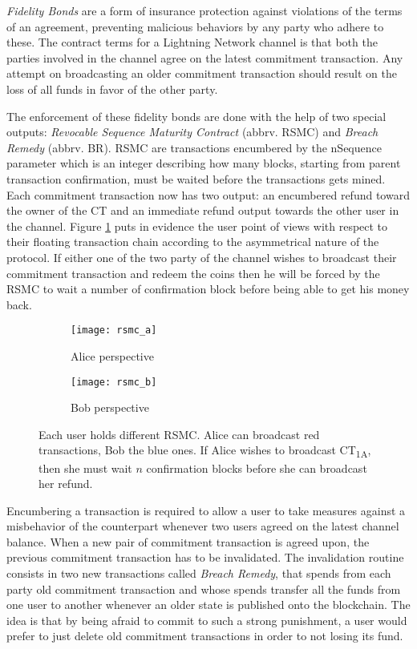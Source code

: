 		\textit{Fidelity Bonds} are a form of insurance protection against violations of the terms of an agreement, preventing malicious behaviors by any party who adhere to these. The contract terms for a Lightning Network channel is that both the parties involved in the channel agree on the latest commitment transaction. Any attempt on broadcasting an older commitment transaction should result on the loss of all funds in favor of the other party. 
		
		The enforcement of these fidelity bonds are done with the help of two special outputs: \textit{Revocable Sequence Maturity Contract} (abbrv. RSMC) and \textit{Breach Remedy} (abbrv. BR). RSMC are transactions encumbered by the nSequence parameter which is an integer describing how many blocks, starting from parent transaction confirmation, must be waited before the transactions gets mined. Each commitment transaction now has two output: an encumbered refund toward the owner of the CT and an immediate refund output towards the other user in the channel. 
		Figure \ref{rsmc} puts in evidence the user point of views with respect to their floating transaction chain according to the asymmetrical nature of the protocol. If either one of the two party of the channel wishes to broadcast their commitment transaction and redeem the coins then he will be forced by the RSMC to wait a number of confirmation block before being able to get his money back.
		
		\begin{figure}
			\centering
			\begin{subfigure}{0.4\textwidth}
				\centering
				\texttt{[image: rsmc\_a]}
				\caption{Alice perspective}
			\end{subfigure}
			\begin{subfigure}{0.4\textwidth}	
				\centering
				\texttt{[image: rsmc\_b]}
				\caption{Bob perspective}
			\end{subfigure}
			\caption{Each user holds different RSMC. Alice can broadcast red transactions, Bob the blue ones. If Alice wishes to broadcast CT\textsubscript{1A}, then she must wait \(n\) confirmation blocks before she can broadcast her refund.}
			\label{rsmc}
		\end{figure}
		
		Encumbering a transaction is required to allow a user to take measures against a misbehavior of the counterpart whenever two users agreed on the latest channel balance. When a new pair of commitment transaction is agreed upon, the previous commitment transaction has to be invalidated. The invalidation routine consists in two new transactions called \textit{Breach Remedy}, that spends from each party old commitment transaction and whose spends transfer all the funds from one user to another whenever an older state is published onto the blockchain. The idea is that by being afraid to commit to such a strong punishment, a user would prefer to just delete old commitment transactions in order to not losing its fund.
		
